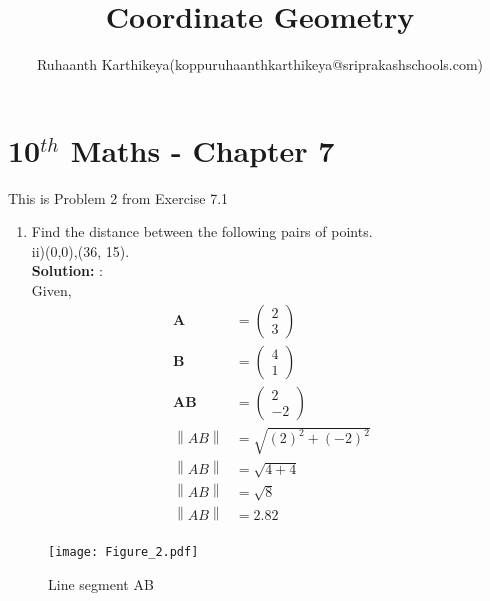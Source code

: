 \documentclass[12pt]{article}
\title{Coordinate Geometry}
\author{Ruhaanth Karthikeya(koppuruhaanthkarthikeya@sriprakashschools.com)}
\newcommand{\myvec}[1]{\ensuremath{\begin{pmatrix}#1\end{pmatrix}}}
\newcommand{\solution}{\noindent \textbf{Solution: }}
\providecommand{\norm}[1]{\left\lVert#1\right\rVert}
\let\vec\mathbf
\begin{document}
\maketitle
\section*{10$^{th}$ Maths - Chapter 7}
This is Problem 2 from Exercise 7.1
\begin{enumerate}
\item Find the distance between the following pairs of points.\\
 ii)(0,0),(36, 15).\\
\solution:\\
Given,
\begin{align}
\vec{A}&=\myvec{2\\3}\\
\vec{B}&=\myvec{4\\1}\\
\vec{AB}&=\myvec{2\\-2}\\
\norm{AB}&=\sqrt{(2)^2+(-2)^2}\\
\norm{AB}&=\sqrt{4+4}\\
\norm{AB}&=\sqrt{8}\\
\norm{AB}&=2.82\\
\end{align}
\end{enumerate}
\begin{figure}[H]
			\centering
			\texttt{[image: Figure\_2.pdf]}
			\caption{Line segment AB}
			\label{fig:18}
		\end{figure}
\end{document}
